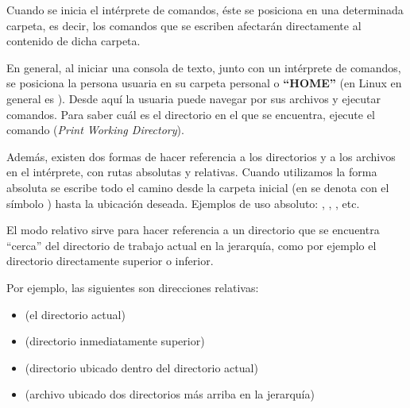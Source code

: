 \documentclass[12pt]{article}
\begin{document}
Cuando se inicia el intérprete de comandos, éste se posiciona en una
determinada carpeta, es decir, los comandos que se escriben afectarán
directamente al contenido de dicha carpeta.

En general, al iniciar una consola de texto, junto con un intérprete de
comandos, se posiciona la persona usuaria en su carpeta personal o
\textbf{``HOME''} (en Linux en general es ). Desde aquí
la usuaria puede navegar por sus archivos y ejecutar comandos. Para saber cuál
es el directorio en el que se encuentra, ejecute el comando 
(\emph{Print Working Directory}).

Además, existen dos formas de hacer referencia a los directorios y a los
archivos en el intérprete, con rutas absolutas y relativas. Cuando utilizamos
la forma absoluta se escribe todo el camino desde la carpeta inicial (en
 se denota con el símbolo ) hasta la ubicación deseada.
Ejemplos de uso absoluto: , , ,
etc.

El modo relativo sirve para hacer referencia a un directorio que se encuentra
``cerca'' del directorio de trabajo actual en la jerarquía, como por ejemplo
el directorio directamente superior o inferior.

Por ejemplo, las siguientes son direcciones relativas:

\vspace{-2\topsep}
\begin{itemize}

    \itemsep2pt \parskip0pt 

    \item {} (el directorio actual)

    \item {} (directorio inmediatamente superior)

    \item {} (directorio  ubicado dentro del
        directorio actual)

    \item {} (archivo ubicado dos directorios más arriba en
        la jerarquía)

\end{itemize}
\end{document}
